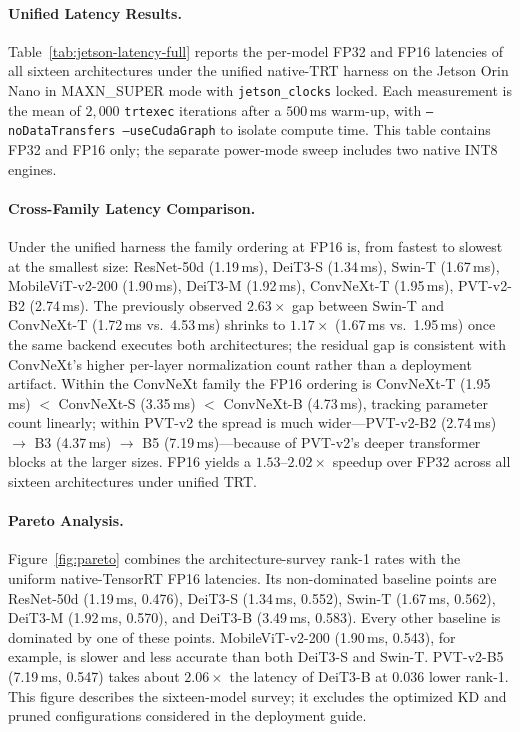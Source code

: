 \documentclass[runningheads,a4paper]{llncs}
\begin{document}
\paragraph{Unified Latency Results.}
Table~\ref{tab:jetson-latency-full} reports the per-model FP32 and FP16 latencies of all sixteen architectures under the unified native-TRT harness on the Jetson Orin Nano in MAXN\_SUPER mode with \texttt{jetson\_clocks} locked. Each measurement is the mean of $2{,}000$ \texttt{trtexec} iterations after a $500$\,ms warm-up, with \texttt{--noDataTransfers --useCudaGraph} to isolate compute time. This table contains FP32 and FP16 only; the separate power-mode sweep includes two native INT8 engines.

\paragraph{Cross-Family Latency Comparison.}
Under the unified harness the family ordering at FP16 is, from fastest to slowest at the smallest size: ResNet-50d (1.19\,ms), DeiT3-S (1.34\,ms), Swin-T (1.67\,ms), MobileViT-v2-200 (1.90\,ms), DeiT3-M (1.92\,ms), ConvNeXt-T (1.95\,ms), PVT-v2-B2 (2.74\,ms). The previously observed $2.63\times$ gap between Swin-T and ConvNeXt-T (1.72\,ms vs.\ 4.53\,ms) shrinks to $1.17\times$ (1.67\,ms vs.\ 1.95\,ms) once the same backend executes both architectures; the residual gap is consistent with ConvNeXt's higher per-layer normalization count rather than a deployment artifact. Within the ConvNeXt family the FP16 ordering is ConvNeXt-T (1.95\,ms) $<$ ConvNeXt-S (3.35\,ms) $<$ ConvNeXt-B (4.73\,ms), tracking parameter count linearly; within PVT-v2 the spread is much wider---PVT-v2-B2 (2.74\,ms) $\to$ B3 (4.37\,ms) $\to$ B5 (7.19\,ms)---because of PVT-v2's deeper transformer blocks at the larger sizes. FP16 yields a $1.53$--$2.02\times$ speedup over FP32 across all sixteen architectures under unified TRT.

\paragraph{Pareto Analysis.}
Figure~\ref{fig:pareto} combines the architecture-survey rank-1 rates with the uniform native-TensorRT FP16 latencies. Its non-dominated baseline points are ResNet-50d (1.19\,ms, 0.476), DeiT3-S (1.34\,ms, 0.552), Swin-T (1.67\,ms, 0.562), DeiT3-M (1.92\,ms, 0.570), and DeiT3-B (3.49\,ms, 0.583). Every other baseline is dominated by one of these points. MobileViT-v2-200 (1.90\,ms, 0.543), for example, is slower and less accurate than both DeiT3-S and Swin-T. PVT-v2-B5 (7.19\,ms, 0.547) takes about $2.06\times$ the latency of DeiT3-B at 0.036 lower rank-1. This figure describes the sixteen-model survey; it excludes the optimized KD and pruned configurations considered in the deployment guide.
\end{document}
